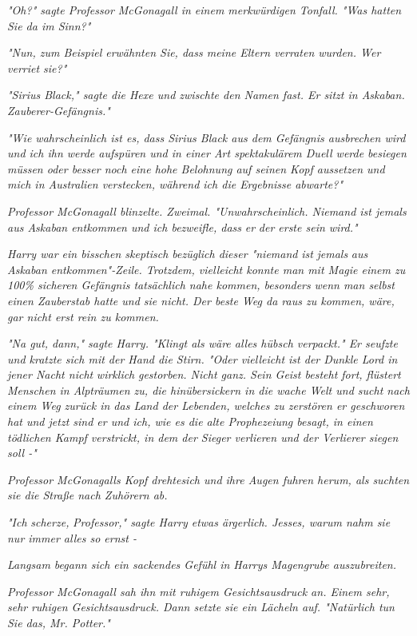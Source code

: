 {\emph{"Oh?" sagte Professor McGonagall in einem merkwürdigen Tonfall. "Was hatten Sie da im Sinn?"}

\emph{"Nun, zum Beispiel erwähnten Sie, dass meine Eltern verraten wurden. Wer verriet sie?"}

\emph{"Sirius Black," sagte die Hexe und zwischte den Namen fast. Er sitzt in Askaban. Zauberer-Gefängnis."}

\emph{"Wie wahrscheinlich ist es, dass Sirius Black aus dem Gefängnis ausbrechen wird und ich ihn werde aufspüren und in einer Art spektakulärem Duell werde besiegen müssen oder besser noch eine hohe Belohnung auf seinen Kopf aussetzen und mich in Australien verstecken, während ich die Ergebnisse abwarte?"}

\emph{Professor McGonagall blinzelte. Zweimal. "Unwahrscheinlich. Niemand ist jemals aus Askaban entkommen und ich bezweifle, dass} \emph{\emph{er}} \emph{der erste sein wird."}

\emph{Harry war ein bisschen skeptisch bezüglich dieser "\emph{niemand}} \emph{ist} \emph{\emph{jemals}} \emph{aus Askaban entkommen"-Zeile. Trotzdem, vielleicht konnte man mit Magie einem zu 100\% sicheren Gefängnis tatsächlich nahe kommen, besonders} \emph{wenn man selbst einen Zauberstab hatte und sie nicht. Der beste Weg da raus zu kommen, wäre, gar nicht erst rein zu kommen.}

\emph{"Na gut, dann," sagte Harry. "Klingt als wäre alles hübsch verpackt." Er seufzte und kratzte sich mit der Hand die Stirn. "Oder vielleicht ist der Dunkle Lord in jener Nacht nicht} \emph{\emph{wirklich}} \emph{gestorben. Nicht ganz. Sein Geist besteht fort, flüstert Menschen in Alpträumen zu, die hinübersickern in die wache Welt und sucht nach einem Weg zurück in das Land der Lebenden, welches zu zerstören er geschworen hat und jetzt sind er und ich, wie es die alte Prophezeiung besagt, in einen tödlichen Kampf verstrickt, in dem der Sieger verlieren und der Verlierer siegen soll -"}

\emph{Professor McGonagalls Kopf drehtesich und ihre Augen fuhren herum, als suchten sie die Straße nach Zuhörern ab.}

\emph{"Ich} \emph{\emph{scherze,}} \emph{Professor," sagte Harry etwas ärgerlich. Jesses, warum nahm sie nur immer alles so ernst -}

\emph{Langsam begann sich ein sackendes Gefühl in Harrys Magengrube auszubreiten.}

\emph{Professor McGonagall sah ihn mit ruhigem Gesichtsausdruck an. Einem sehr,} \emph{\emph{sehr}} \emph{ruhigen Gesichtsausdruck. Dann setzte sie ein Lächeln auf. "Natürlich tun Sie das, Mr. Potter."}

}
